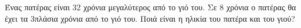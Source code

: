 Ένας πατέρας είναι 32 χρόνια μεγαλύτερος από το γιό του. Σε 8 χρόνια ο πατέρας θα έχει τα 3πλάσια χρόνια από το γιό του. Ποιά είναι η ηλικία του πατέρα και του γιού?